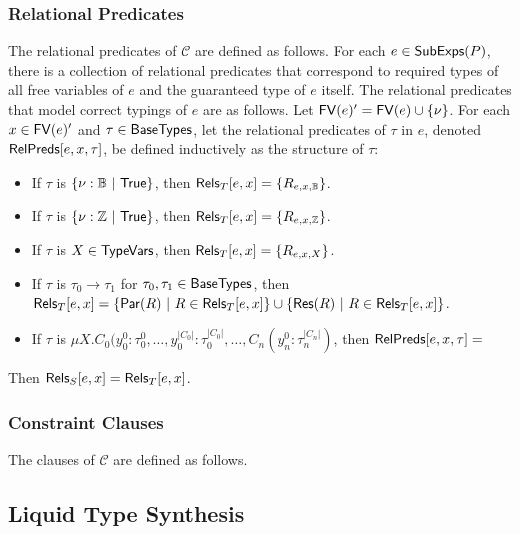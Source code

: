 \subsubsection{Relational Predicates}
\label{s:rel-preds}
The relational predicates of $\mathcal{C}$ are defined as follows.
%
For each $e \in \subexps(P)$, there is a collection of relational
predicates that correspond to required types of all free variables of
$e$ and the guaranteed type of $e$ itself.
%
The relational predicates that model correct typings of $e$ are as
follows.
%
Let $\freevars(e)' = \add{\freevars(e)}{\nu}$.
%
For each $x \in \freevars(e)'$ and $\tau \in \basetypes$,
%
%
let the relational predicates of $\tau$ in $e$, denoted
$\relpredsof{e}{x}{\tau}$, be defined inductively as the structure of
$\tau$:
\begin{itemize}
\item
  If $\tau$ is $\setformer{\nu : \bools}{ \true }$, then
  $\typerelpredsof{ e }{ x }{ \tau } = \elts{ \relpredof{ e }{ x }{
      \bools } }$.
\item
  If $\tau$ is $\setformer{\nu : \ints}{ \true }$, then
  $\typerelpredsof{ e }{ x }{ \tau } = \elts{ \relpredof{ e }{ x }{
      \ints } }$.
\item
  If $\tau$ is $X \in \typevars$, then $\typerelpredsof{ e }{ x }{
    \tau } = \elts{ \relpredof{ e }{ x }{ X } }$.
\item
  If $\tau$ is $\tau_0 \to \tau_1$ for $\tau_0, \tau_1 \in
  \basetypes$, then $\typerelpredsof{ e }{ x }{ \tau } =
  \setformer{ \paramrelcons(R) }{ R \in \typerelpredsof{ e }{ x }{
      \tau_0 } } %
  \union \setformer{ \resrelcons(R) }{ R \in
    \typerelpredsof{e}{x}{\tau_1} }$.
\item 
  If $\tau$ is $\mu X. C_0(y_0^0 : \tau_0^0, \ldots, y_0^{|C_0|} :
  \tau_0^{|C_0|}, \ldots, C_n(y_n^0 : \tau_n^{|C_n|})$, then
  $\relpredsof{ e }{ x }{ \tau } = $
\end{itemize}
%
Then $\symrelpreds{ e }{ x } = \typerelpredsof{ e }{ x }{ \basetype{ e
  }{ x } }$.
%

\subsubsection{Constraint Clauses}
\label{s:clauses}
The clauses of $\mathcal{C}$ are defined as follows.

%

%
\subsection{Liquid Type Synthesis}
\label{s:liquid-type-syn}
